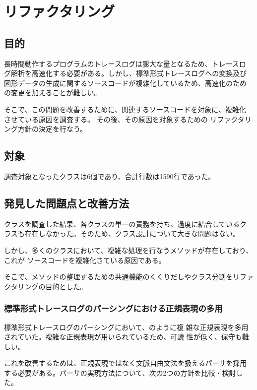 \chapter{リファクタリング}\label{ch:ref}
\section{目的}
長時間動作するプログラムのトレースログは膨大な量となるため、トレースロ
グ解析を高速化する必要がある。しかし、標準形式トレースログへの変換及び
図形データの生成に関するソースコードが複雑化しているため、高速化のため
の変更を加えることが難しい。

そこで、この問題を改善するために、関連するソースコードを対象に、複雑化
させている原因を調査する。
その後、その原因を対象するための
リファクタリング方針の決定を行なう。

\section{対象}
調査対象となったクラスは6個であり、合計行数は1590行であった。


\section{発見した問題点と改善方法}
クラスを調査した結果、各クラスの単一の責務を持ち、過度に結合しているク
ラスも存在しなかった。そのため、クラス設計について大きな問題はない。

しかし、多くのクラスにおいて、複雑な処理を行なうメソッドが存在しており、これが
ソースコードを複雑化さている原因である。

そこで、メソッドの整理するための共通機能のくくりだしやクラス分割をリファクタリングの目的とした。

\subsection{標準形式トレースログのパーシングにおける正規表現の多用}
標準形式トレースログのパーシングにおいて、のように複
雑な正規表現を多用されていた。複雑な正規表現が用いられているため、可読
性が低く、保守も難しい。

これを改善するためは、正規表現ではなく文脈自由文法を扱えるパーサを採用
する必要がある。パーサの実現方法について、次の2つの方針を比較・検討した。


